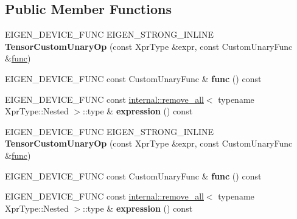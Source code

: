 \subsection*{Public Member Functions}
\begin{DoxyCompactItemize}
\item 
\mbox{\label{class_eigen_1_1_tensor_custom_unary_op_a1251cfb58bbce5908504ff1ceda87f66}} 
E\+I\+G\+E\+N\+\_\+\+D\+E\+V\+I\+C\+E\+\_\+\+F\+U\+NC E\+I\+G\+E\+N\+\_\+\+S\+T\+R\+O\+N\+G\+\_\+\+I\+N\+L\+I\+NE {\bfseries Tensor\+Custom\+Unary\+Op} (const Xpr\+Type \&expr, const Custom\+Unary\+Func \&\hyperlink{structfunc}{func})
\item 
\mbox{\label{class_eigen_1_1_tensor_custom_unary_op_a6be39de815baf8ac19e3a3e7005019b2}} 
E\+I\+G\+E\+N\+\_\+\+D\+E\+V\+I\+C\+E\+\_\+\+F\+U\+NC const Custom\+Unary\+Func \& {\bfseries func} () const
\item 
\mbox{\label{class_eigen_1_1_tensor_custom_unary_op_a21d33a2fe52d3476cabd454be0729738}} 
E\+I\+G\+E\+N\+\_\+\+D\+E\+V\+I\+C\+E\+\_\+\+F\+U\+NC const \hyperlink{struct_eigen_1_1internal_1_1remove__all}{internal\+::remove\+\_\+all}$<$ typename Xpr\+Type\+::\+Nested $>$\+::type \& {\bfseries expression} () const
\item 
\mbox{\label{class_eigen_1_1_tensor_custom_unary_op_a1251cfb58bbce5908504ff1ceda87f66}} 
E\+I\+G\+E\+N\+\_\+\+D\+E\+V\+I\+C\+E\+\_\+\+F\+U\+NC E\+I\+G\+E\+N\+\_\+\+S\+T\+R\+O\+N\+G\+\_\+\+I\+N\+L\+I\+NE {\bfseries Tensor\+Custom\+Unary\+Op} (const Xpr\+Type \&expr, const Custom\+Unary\+Func \&\hyperlink{structfunc}{func})
\item 
\mbox{\label{class_eigen_1_1_tensor_custom_unary_op_a6be39de815baf8ac19e3a3e7005019b2}} 
E\+I\+G\+E\+N\+\_\+\+D\+E\+V\+I\+C\+E\+\_\+\+F\+U\+NC const Custom\+Unary\+Func \& {\bfseries func} () const
\item 
\mbox{\label{class_eigen_1_1_tensor_custom_unary_op_a21d33a2fe52d3476cabd454be0729738}} 
E\+I\+G\+E\+N\+\_\+\+D\+E\+V\+I\+C\+E\+\_\+\+F\+U\+NC const \hyperlink{struct_eigen_1_1internal_1_1remove__all}{internal\+::remove\+\_\+all}$<$ typename Xpr\+Type\+::\+Nested $>$\+::type \& {\bfseries expression} () const
\end{DoxyCompactItemize}
